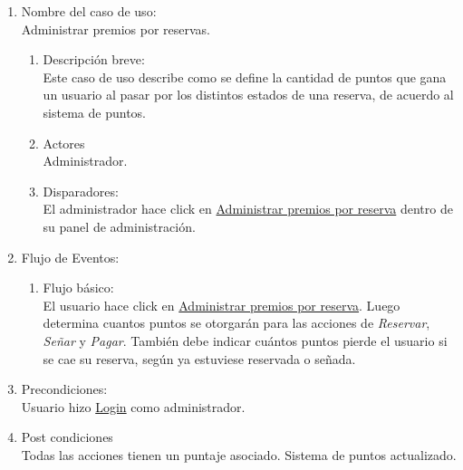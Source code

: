\documentclass[a4paper,11pt]{article}
\begin{document}

\begin{enumerate}

    \item Nombre del caso de uso: \\
    Administrar premios por reservas.

    \begin{enumerate}
    \item Descripción breve: \\
        Este caso de uso describe como se define la cantidad de puntos que gana
        un usuario al pasar por los distintos estados de una reserva, de acuerdo
        al sistema de puntos.
    \item Actores \\
        Administrador.
    \item Disparadores: \\
        El administrador hace click en \underline{Administrar premios por reserva}
        dentro de su panel de administración.
    \end{enumerate}

    \item Flujo de Eventos: \\

    \begin{enumerate}

        \item Flujo básico:\\
            El usuario hace click en \underline{Administrar premios por reserva}.
            Luego determina cuantos puntos se otorgarán para las acciones de
            \textit{Reservar}, \textit{Señar} y \textit{Pagar}.
            También debe indicar cuántos puntos pierde el usuario si se cae
            su reserva, según ya estuviese reservada o señada.
    \end{enumerate}

    \item Precondiciones: \\
        Usuario hizo \underline{Login} como administrador.

    \item Post condiciones \\
        Todas las acciones tienen un puntaje asociado. Sistema de puntos
        actualizado.

\end{enumerate}

\end{document}
